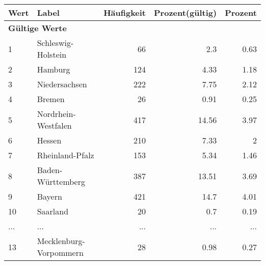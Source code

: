      \begin{longtable}{lXrrr}
     \toprule
     \textbf{Wert} & \textbf{Label} & \textbf{Häufigkeit} & \textbf{Prozent(gültig)} & \textbf{Prozent} \\
     \endhead
     \midrule
     \multicolumn{5}{l}{\textbf{Gültige Werte}}\\
        1 & \multicolumn{1}{X}{Schleswig-Holstein} & %
          \num{66} &
          \num[round-mode=places,round-precision=2]{2,3} &
          \num[round-mode=places,round-precision=2]{0,63} \\
        2 & \multicolumn{1}{X}{Hamburg} & %
          \num{124} &
          \num[round-mode=places,round-precision=2]{4,33} &
          \num[round-mode=places,round-precision=2]{1,18} \\
        3 & \multicolumn{1}{X}{Niedersachsen} & %
          \num{222} &
          \num[round-mode=places,round-precision=2]{7,75} &
          \num[round-mode=places,round-precision=2]{2,12} \\
        4 & \multicolumn{1}{X}{Bremen} & %
          \num{26} &
          \num[round-mode=places,round-precision=2]{0,91} &
          \num[round-mode=places,round-precision=2]{0,25} \\
        5 & \multicolumn{1}{X}{Nordrhein-Westfalen} & %
          \num{417} &
          \num[round-mode=places,round-precision=2]{14,56} &
          \num[round-mode=places,round-precision=2]{3,97} \\
        6 & \multicolumn{1}{X}{Hessen} & %
          \num{210} &
          \num[round-mode=places,round-precision=2]{7,33} &
          \num[round-mode=places,round-precision=2]{2} \\
        7 & \multicolumn{1}{X}{Rheinland-Pfalz} & %
          \num{153} &
          \num[round-mode=places,round-precision=2]{5,34} &
          \num[round-mode=places,round-precision=2]{1,46} \\
        8 & \multicolumn{1}{X}{Baden-Württemberg} & %
          \num{387} &
          \num[round-mode=places,round-precision=2]{13,51} &
          \num[round-mode=places,round-precision=2]{3,69} \\
        9 & \multicolumn{1}{X}{Bayern} & %
          \num{421} &
          \num[round-mode=places,round-precision=2]{14,7} &
          \num[round-mode=places,round-precision=2]{4,01} \\
        10 & \multicolumn{1}{X}{Saarland} & %
          \num{20} &
          \num[round-mode=places,round-precision=2]{0,7} &
          \num[round-mode=places,round-precision=2]{0,19} \\
       ... & ... & ... & ... & ... \\
        13 & \multicolumn{1}{X}{Mecklenburg-Vorpommern} & %
          \num{28} &
          \num[round-mode=places,round-precision=2]{0,98} &
          \num[round-mode=places,round-precision=2]{0,27} \\


\end{longtable}
